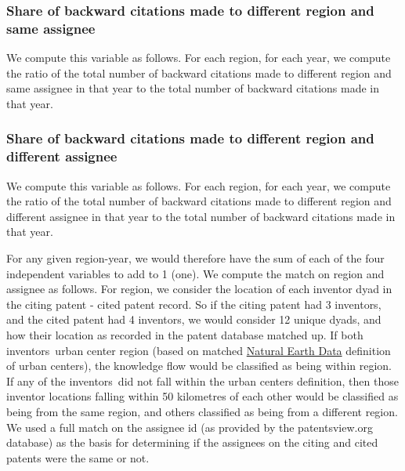 \documentclass[12pt,letterpaper]{article}
\begin{document}
\subsubsection{Share of backward citations made to different region and same assignee}
We compute this variable as follows. For each region, for each year, we compute the ratio of the total number of backward citations made to different region and same assignee in that year to the total number of backward citations made in that year.
\subsubsection{Share of backward citations made to different region and different assignee}
We compute this variable as follows. For each region, for each year, we compute the ratio of the total number of backward citations made to different region and different assignee in that year to the total number of backward citations made in that year.\par

For any given region-year, we would therefore have the sum of each of the four independent variables to add to 1 (one). We compute the match on region and assignee as follows. For region, we consider the location of each inventor dyad in the citing patent - cited patent record. So if the citing patent had 3 inventors, and the cited patent had 4 inventors, we would consider 12 unique dyads, and how their location as recorded in the patent database matched up. If both inventors\textquotesingle \ urban center region (based on  matched \href{http://www.naturalearthdata.com/downloads/10m-cultural-vectors/}{Natural Earth Data} definition of urban centers), the knowledge flow would be classified as being within region. If any of the inventors\textquotesingle \ did not fall within the urban centers definition, then those inventor locations falling within 50 kilometres of each other would be classified as being from the same region, and others classified as being from a different region. We used a full match on the assignee id (as provided by the patentsview.org database) as the basis for determining if the assignees on the citing and cited patents were the same or not.
\end{document}
